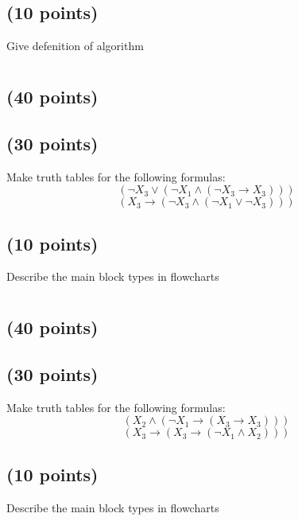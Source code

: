 \documentclass[a4paper,10pt]{article}
\begin{document}
\subsection{(10 points)}
Give defenition of algorithm

\newpage

\section{}
\subsection{(40 points)}


\subsection{(30 points)}
 Make truth tables for the following formulas:
\[
(\neg X_{3} \vee (\neg X_{1} \wedge (\neg X_{3} \rightarrow X_{3})))
\]
\[
(X_{3} \rightarrow (\neg X_{3} \wedge (\neg X_{1} \vee \neg X_{3})))
\]

\subsection{(10 points)}
Describe the main block types in flowcharts

\newpage

\section{}
\subsection{(40 points)}


\subsection{(30 points)}
 Make truth tables for the following formulas:
\[
(X_{2} \wedge (\neg X_{1} \rightarrow (X_{3} \rightarrow X_{3})))
\]
\[
(X_{3} \rightarrow (X_{3} \rightarrow (\neg X_{1} \wedge X_{2})))
\]

\subsection{(10 points)}
Describe the main block types in flowcharts

\newpage
\end{document}
